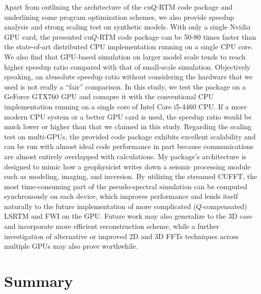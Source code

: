 Apart from outlining the architecture of the cu$Q$-RTM code package and underlining some program optimization schemes, we also provide speedup analysis and strong scaling test on synthetic models. With only a single Nvidia GPU card, the presented cu$Q$-RTM code package can be 50-80 times faster than the state-of-art distributed CPU implementation running on a single CPU core. We also find that GPU-based simulation on larger model scale tends to reach higher speedup ratio compared with that of small-scale simulation. Objectively speaking, an abusolute speedup ratio without considering the hardware that we used is not really a ``fair'' comparison. In this study, we test the package on a GeForce GTX760 GPU and comapre it with the conventional CPU implementation running on a single core of Intel Core i5-4460 CPU. If a more modern CPU system or a better GPU card is used, the speedup ratio would be much lower or higher than that we claimed in this study. Regarding the scaling test on multi-GPUs, the provided code package exhibits excellent scalability and can be run with almost ideal code performance in part because communications are almost entirely overlapped with calculations. My package's architecture is designed to mimic how a geophysicist writes down a seismic processing module such as modeling, imaging, and inversion. By utilizing the streamed CUFFT, the most time-consuming part of the pseudo-spectral simulation can be computed synchronously on each device, which improves performance and lends itself naturally to the future implementation of more complicated ($Q$-compensated) LSRTM and FWI \citep{Yang2015A, jaros2016full} on the GPU. Future work may also generalize to the 3D case and incorporate more efficient reconstruction scheme, while a further investigation of alternative or improved 2D and 3D FFTs techniques across multiple GPUs \citep{jaros2012use, jaros2016spectral} may also prove worthwhile.  

\section{Summary}

